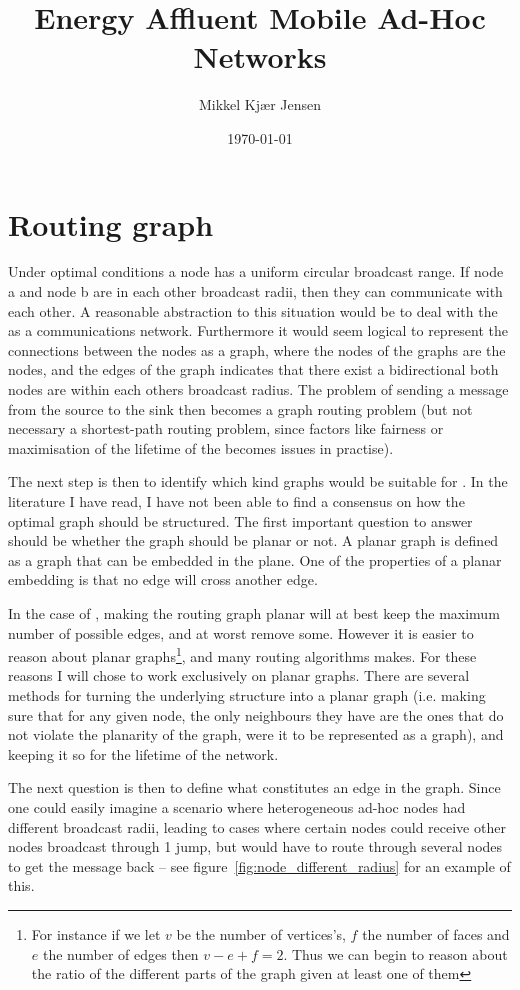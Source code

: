 \documentclass[letter, 12pt, english, draft]{article}
\title{Energy Affluent Mobile Ad-Hoc Networks}
\author{Mikkel Kjær Jensen}
\date{\today}
\begin{document}
\pagestyle{plain}

\section{Routing graph}

Under optimal conditions a node has a uniform circular broadcast range. If node a and node b are in each other broadcast radii, then they can communicate with each other. A reasonable abstraction to this situation would be to deal with the \manet as a communications network. Furthermore it would seem logical to represent the connections between the nodes as a graph, where the nodes of the graphs are the \manet nodes, and the edges of the graph indicates that there exist a bidirectional both nodes are within each others broadcast radius. The problem of sending a message from the source to the sink then becomes a graph routing problem (but not necessary a shortest-path routing problem, since factors like fairness or maximisation of the lifetime of the \manet becomes issues in practise).

The next step is then to identify which kind graphs would be suitable for \manet. In the literature I have read, I have not been able to find a consensus on how the optimal graph should be structured. The first important question to answer should be whether the graph should be planar or not. A planar graph is defined as a graph that can be embedded in the plane. One of the properties of a planar embedding is that no edge will cross another edge. 

In the case of \manet, making the routing graph planar will at best keep the maximum number of possible edges, and at worst remove some. However it is easier to reason about planar graphs\footnote{For instance if we let $v$ be the number of vertices's, $f$ the number of faces and $e$ the number of edges then $v - e + f = 2$. Thus we can begin to reason about the ratio of the different parts of the graph given at least one of them}, and many routing algorithms makes. For these reasons I will chose to work exclusively on planar graphs. There are several methods for turning the underlying structure into a planar graph (i.e. making sure that for any given node, the only neighbours they have are the ones that do not violate the planarity of the graph, were it to be represented as a graph), and keeping it so for the lifetime of the network. 

The next question is then to define what constitutes an edge in the graph. Since one could easily imagine a scenario where heterogeneous ad-hoc nodes had different broadcast radii, leading to cases where certain nodes could receive other nodes broadcast through 1 jump, but would have to route through several nodes to get the message back -- see figure~\ref{fig:node_different_radius} for an example of this.
\end{document}
